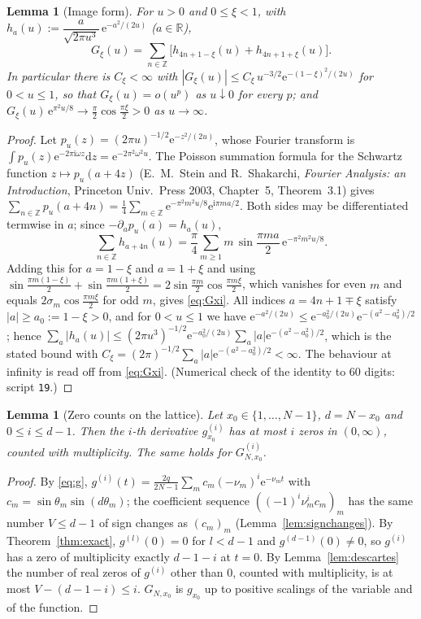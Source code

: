 \documentclass[11pt,a4paper]{article}
\newtheorem{lemma}[theorem]{Lemma}
\theoremstyle{definition}
\theoremstyle{remark}
\newcommand{\R}{\mathbb{R}}
\newcommand{\Z}{\mathbb{Z}}
\newcommand{\ee}{\mathrm{e}}
\newcommand{\dd}{\mathrm{d}}
\begin{document}
\begin{lemma}[Image form]\label{lem:image}
For $u>0$ and $0\le\xi<1$, with $h_a(u):=\dfrac{a}{\sqrt{2\pi u^3}}\,\ee^{-a^2/(2u)}$ ($a\in\R$),
\[
   G_\xi(u)=\sum_{n\in\Z}\bigl[h_{4n+1-\xi}(u)+h_{4n+1+\xi}(u)\bigr] .
\]
In particular there is $C_\xi<\infty$ with $|G_\xi(u)|\le C_\xi\,u^{-3/2}\ee^{-(1-\xi)^2/(2u)}$ for $0<u\le1$, so that
$G_\xi(u)=o(u^p)$ as $u\downarrow0$ for every $p$; and $G_\xi(u)\,\ee^{\pi^2u/8}\to\frac\pi2\cos\frac{\pi\xi}2>0$ as $u\to\infty$.
\end{lemma}
\begin{proof}
Let $p_u(z)=(2\pi u)^{-1/2}\ee^{-z^2/(2u)}$, whose Fourier transform is
$\int p_u(z)\ee^{-2\pi\mathrm i\omega z}\dd z=\ee^{-2\pi^2\omega^2u}$. The Poisson summation formula for the Schwartz
function $z\mapsto p_u(a+4z)$ (E.~M.~Stein and R.~Shakarchi, \emph{Fourier Analysis: an Introduction}, Princeton
Univ.\ Press 2003, Chapter~5, Theorem~3.1) gives
$\sum_{n\in\Z}p_u(a+4n)=\frac14\sum_{m\in\Z}\ee^{-\pi^2m^2u/8}\ee^{\mathrm i\pi ma/2}$. Both sides may be differentiated
termwise in $a$; since $-\partial_ap_u(a)=h_a(u)$,
\[
  \sum_{n\in\Z}h_{a+4n}(u)=\frac\pi4\sum_{m\ge1}m\,\sin\frac{\pi ma}2\,\ee^{-\pi^2m^2u/8}.
\]
Adding this for $a=1-\xi$ and $a=1+\xi$ and using
$\sin\frac{\pi m(1-\xi)}2+\sin\frac{\pi m(1+\xi)}2=2\sin\frac{\pi m}2\cos\frac{\pi m\xi}2$, which vanishes for even $m$
and equals $2\sigma_m\cos\frac{\pi m\xi}2$ for odd $m$, gives \eqref{eq:Gxi}. All indices $a=4n+1\mp\xi$ satisfy $|a|\ge a_0:=1-\xi>0$, and for $0<u\le1$ we have
$\ee^{-a^2/(2u)}\le\ee^{-a_0^2/(2u)}\ee^{-(a^2-a_0^2)/2}$; hence
$\sum_a|h_a(u)|\le(2\pi u^3)^{-1/2}\ee^{-a_0^2/(2u)}\sum_a|a|\ee^{-(a^2-a_0^2)/2}$, which is the stated bound with
$C_\xi=(2\pi)^{-1/2}\sum_a|a|\ee^{-(a^2-a_0^2)/2}<\infty$. The behaviour at infinity is read off
from \eqref{eq:Gxi}. (Numerical check of the identity to $60$ digits: script \texttt{19}.)
\end{proof}

\begin{lemma}[Zero counts on the lattice]\label{lem:zerocount}
Let $x_0\in\{1,\dots,N-1\}$, $d=N-x_0$ and $0\le i\le d-1$. Then the $i$-th derivative $g_{x_0}^{(i)}$ has at most $i$
zeros in $(0,\infty)$, counted with multiplicity. The same holds for $G_{N,x_0}^{(i)}$.
\end{lemma}
\begin{proof}
By \eqref{eq:g}, $g^{(i)}(t)=\frac{2q}{2N-1}\sum_mc_m(-\nu_m)^i\ee^{-\nu_mt}$ with $c_m=\sin\theta_m\sin(d\theta_m)$; the
coefficient sequence $((-1)^i\nu_m^ic_m)_m$ has the same number $V\le d-1$ of sign changes as $(c_m)_m$
(Lemma~\ref{lem:signchanges}). By Theorem~\ref{thm:exact}, $g^{(l)}(0)=0$ for $l<d-1$ and $g^{(d-1)}(0)\ne0$, so $g^{(i)}$
has a zero of multiplicity exactly $d-1-i$ at $t=0$. By Lemma~\ref{lem:descartes} the number of real zeros of
$g^{(i)}$ other than $0$, counted with multiplicity, is at most $V-(d-1-i)\le i$. $G_{N,x_0}$ is $g_{x_0}$ up to
positive scalings of the variable and of the function.
\end{proof}
\end{document}
